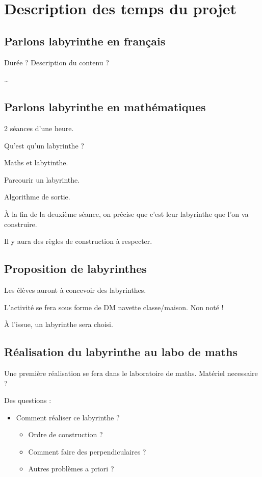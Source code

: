 
\section{Description des temps du projet}
\subsection{Parlons labyrinthe en français}
Durée ? Description du contenu ?

\dots

\subsection{Parlons labyrinthe en mathématiques}
2 séances d'une heure.

Qu'est qu'un labyrinthe ?

Maths et labytinthe.

Parcourir un labyrinthe.

Algorithme de sortie.

À la fin de la deuxième séance, on précise que c'est leur labyrinthe que l'on va construire.

Il y aura des règles de construction à respecter.

\subsection{Proposition de labyrinthes}
Les élèves auront à concevoir des labyrinthes.

L'activité se fera sous forme de DM navette classe/maison. Non noté !

À l'issue, un labyrinthe sera choisi.
\subsection{Réalisation du labyrinthe au labo de maths}
Une première réalisation se fera dans le laboratoire de maths.
Matériel necessaire ?

Des questions :
\begin{itemize}
    \item Comment réaliser ce labyrinthe ? 
    \begin{itemize}
        \item Ordre de construction ?
        \item Comment faire des perpendiculaires ?
        \item Autres problèmes a priori ?
    \end{itemize}
\end{itemize}

